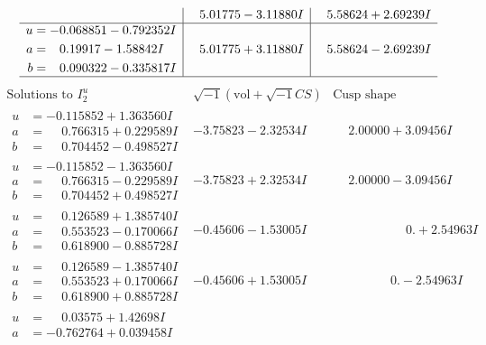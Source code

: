 \documentclass[1p]{elsarticle_modified}
\theoremstyle{definition}
\newcommand{\I}{\sqrt{-1}}
\begin{document}
$$\begin{array}{c|c|c}
 & \phantom{-}5.01775 - 3.11880 I & \phantom{-}5.58624 + 2.69239 I \\ \hline\begin{aligned}
u &= -0.068851 - 0.792352 I \\
a &= \phantom{-}0.19917 - 1.58842 I \\
b &= \phantom{-}0.090322 - 0.335817 I\end{aligned}
 & \phantom{-}5.01775 + 3.11880 I & \phantom{-}5.58624 - 2.69239 I\\
 \hline 
 \end{array}$$\newpage$$\begin{array}{c|c|c}  
\text{Solutions to }I^u_{2}& \I (\text{vol} + \sqrt{-1}CS) & \text{Cusp shape}\\
 \hline 
\begin{aligned}
u &= -0.115852 + 1.363560 I \\
a &= \phantom{-}0.766315 + 0.229589 I \\
b &= \phantom{-}0.704452 - 0.498527 I\end{aligned}
 & -3.75823 - 2.32534 I & \phantom{-}2.00000 + 3.09456 I \\ \hline\begin{aligned}
u &= -0.115852 - 1.363560 I \\
a &= \phantom{-}0.766315 - 0.229589 I \\
b &= \phantom{-}0.704452 + 0.498527 I\end{aligned}
 & -3.75823 + 2.32534 I & \phantom{-}2.00000 - 3.09456 I \\ \hline\begin{aligned}
u &= \phantom{-}0.126589 + 1.385740 I \\
a &= \phantom{-}0.553523 - 0.170066 I \\
b &= \phantom{-}0.618900 - 0.885728 I\end{aligned}
 & -0.45606 - 1.53005 I & \phantom{-0.000000 -}0. + 2.54963 I \\ \hline\begin{aligned}
u &= \phantom{-}0.126589 - 1.385740 I \\
a &= \phantom{-}0.553523 + 0.170066 I \\
b &= \phantom{-}0.618900 + 0.885728 I\end{aligned}
 & -0.45606 + 1.53005 I & \phantom{-0.000000 } 0. - 2.54963 I \\ \hline\begin{aligned}
u &= \phantom{-}0.03575 + 1.42698 I \\
a &= -0.762764 + 0.039458 I \\

\end{aligned}
\end{array}$$
\end{document}
